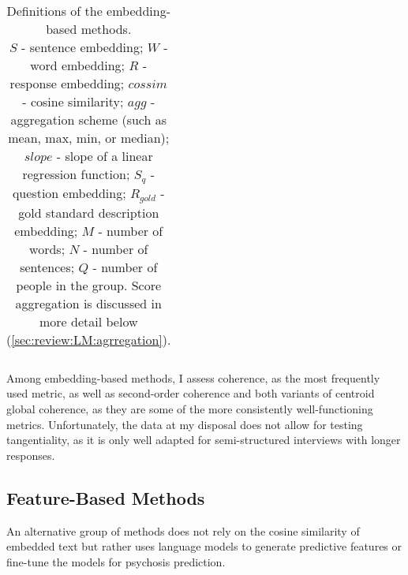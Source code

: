 \begin{table}[h]
{\begin{tabular}{lll}
\end{tabular}}
\captionsetup{width=\textwidth}
\caption[Definitions of the embedding-based methods]{\label{tab:def:LM} Definitions of the embedding-based methods. \\
$S$ - sentence embedding; $W$ - word embedding; $R$ - response embedding; $cossim$ - cosine similarity; $agg$ - aggregation scheme (such as mean, max, min, or median); $slope$ - slope of a linear regression function; $S_q$ - question embedding; $R_{gold}$ - gold standard description embedding; $M$ - number of words; $N$ - number of sentences; $Q$ - number of people in the group. Score aggregation is discussed in more detail below (\ref{sec:review:LM:agrregation}).}
\end{table}

Among embedding-based methods, I assess coherence, as the most frequently used metric, as well as second-order coherence and both variants of centroid global coherence, as they are some of the more consistently well-functioning metrics. Unfortunately, the data at my disposal does not allow for testing tangentiality, as it is only well adapted for semi-structured interviews with longer responses.

\subsection{Feature-Based Methods}
\label{sec:review:LM:features}
An alternative group of methods does not rely on the cosine similarity of embedded text but rather uses language models to generate predictive features or fine-tune the models for psychosis prediction.

